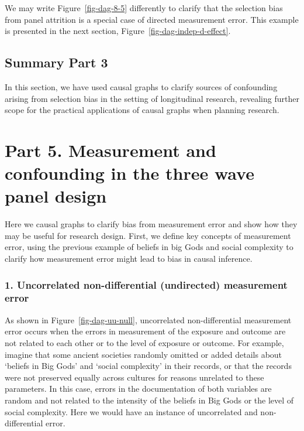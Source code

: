 \documentclass[
  singlecolumn]{report}
\begin{document}
We may write Figure~\ref{fig-dag-8-5} differently to clarify that the
selection bias from panel attrition is a special case of directed
measurement error. This example is presented in the next section,
Figure~\ref{fig-dag-indep-d-effect}.

\hypertarget{summary-part-3}{%
\subsection{Summary Part 3}\label{summary-part-3}}

In this section, we have used causal graphs to clarify sources of
confounding arising from selection bias in the setting of longitudinal
research, revealing further scope for the practical applications of
causal graphs when planning research.

\hypertarget{part-5.-measurement-and-confounding-in-the-three-wave-panel-design}{%
\section{Part 5. Measurement and confounding in the three wave panel
design}\label{part-5.-measurement-and-confounding-in-the-three-wave-panel-design}}

Here we causal graphs to clarify bias from measurement error and show
how they may be useful for research design. First, we define key
concepts of measurement error, using the previous example of beliefs in
big Gods and social complexity to clarify how measurement error might
lead to bias in causal inference.

\hypertarget{uncorrelated-non-differential-undirected-measurement-error}{%
\subsubsection{\texorpdfstring{1. \textbf{Uncorrelated non-differential
(undirected) measurement
error}}{1. Uncorrelated non-differential (undirected) measurement error}}\label{uncorrelated-non-differential-undirected-measurement-error}}

As shown in Figure~\ref{fig-dag-uu-null}, uncorrelated non-differential
measurement error occurs when the errors in measurement of the exposure
and outcome are not related to each other or to the level of exposure or
outcome. For example, imagine that some ancient societies randomly
omitted or added details about `beliefs in Big Gods' and `social
complexity' in their records, or that the records were not preserved
equally across cultures for reasons unrelated to these parameters. In
this case, errors in the documentation of both variables are random and
not related to the intensity of the beliefs in Big Gods or the level of
social complexity. Here we would have an instance of uncorrelated and
non-differential error.
\end{document}
